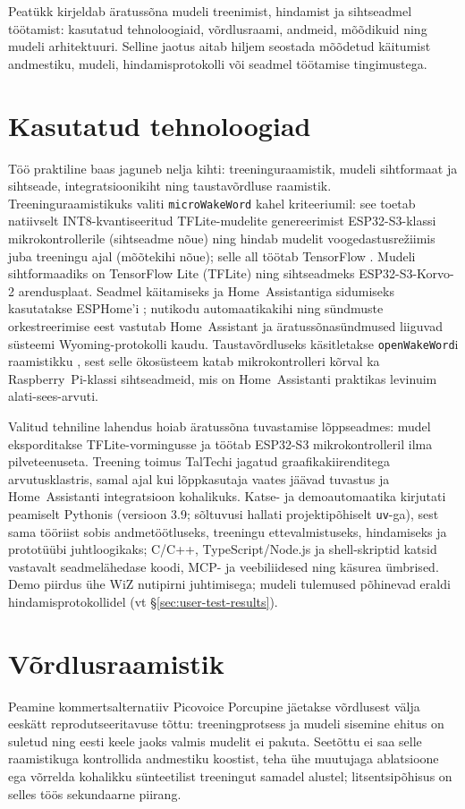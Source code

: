 Peatükk kirjeldab äratussõna mudeli treenimist, hindamist ja sihtseadmel töötamist: kasutatud tehnoloogiaid, võrdlusraami, andmeid, mõõdikuid ning mudeli arhitektuuri. Selline jaotus aitab hiljem seostada mõõdetud käitumist andmestiku, mudeli, hindamisprotokolli või seadmel töötamise tingimustega.

\section{Kasutatud tehnoloogiad}
Töö praktiline baas jaguneb nelja kihti: treeninguraamistik, mudeli sihtformaat ja sihtseade, integratsioonikiht ning taustavõrdluse raamistik. Treeninguraamistikuks valiti \texttt{microWakeWord} \cite{microwakeword2026} kahel kriteeriumil: see toetab natiivselt INT8-kvantiseeritud TFLite-mudelite genereerimist ESP32-S3-klassi mikrokontrollerile (sihtseadme nõue) ning hindab mudelit voogedastusrežiimis juba treeningu ajal (mõõtekihi nõue); selle all töötab TensorFlow \cite{tensorflow2015}. Mudeli sihtformaadiks on TensorFlow Lite (TFLite) ning sihtseadmeks ESP32-S3-Korvo-2 arendusplaat. Seadmel käitamiseks ja Home~Assistantiga sidumiseks kasutatakse ESPHome'i \cite{esphome2026}; nutikodu automaatikakihi ning sündmuste orkestreerimise eest vastutab Home~Assistant \cite{homeassistant2026} ja äratussõnasündmused liiguvad süsteemi Wyoming-protokolli kaudu. Taustavõrdluseks käsitletakse \texttt{openWakeWord}i raamistikku \cite{openwakeword2026}, sest selle ökosüsteem katab mikrokontrolleri kõrval ka Raspberry~Pi-klassi sihtseadmeid, mis on Home~Assistanti praktikas levinuim alati-sees-arvuti.

Valitud tehniline lahendus hoiab äratussõna tuvastamise lõppseadmes: mudel eksporditakse TFLite-vormingusse ja töötab ESP32-S3 mikrokontrolleril ilma pilveteenuseta. Treening toimus TalTechi jagatud graafikakiirenditega arvutusklastris, samal ajal kui lõppkasutaja vaates jäävad tuvastus ja Home~Assistanti integratsioon kohalikuks. Katse- ja demoautomaatika kirjutati peamiselt Pythonis (versioon 3.9; sõltuvusi hallati projektipõhiselt \texttt{uv}-ga), sest sama tööriist sobis andmetöötluseks, treeningu ettevalmistuseks, hindamiseks ja prototüübi juhtloogikaks; C/C++, TypeScript/Node.js ja shell-skriptid katsid vastavalt seadmelähedase koodi, MCP- ja veebiliidesed ning käsurea ümbrised. Demo piirdus ühe WiZ nutipirni juhtimisega; mudeli tulemused põhinevad eraldi hindamisprotokollidel (vt §\ref{sec:user-test-results}).

\section{Võrdlusraamistik}
Peamine kommertsalternatiiv Picovoice Porcupine \cite{picovoice-guide2026} jäetakse võrdlusest välja eeskätt reprodutseeritavuse tõttu: treeningprotsess ja mudeli sisemine ehitus on suletud ning eesti keele jaoks valmis mudelit ei pakuta. Seetõttu ei saa selle raamistikuga kontrollida andmestiku koostist, teha ühe muutujaga ablatsioone ega võrrelda kohalikku sünteetilist treeningut samadel alustel; litsentsipõhisus on selles töös sekundaarne piirang.

